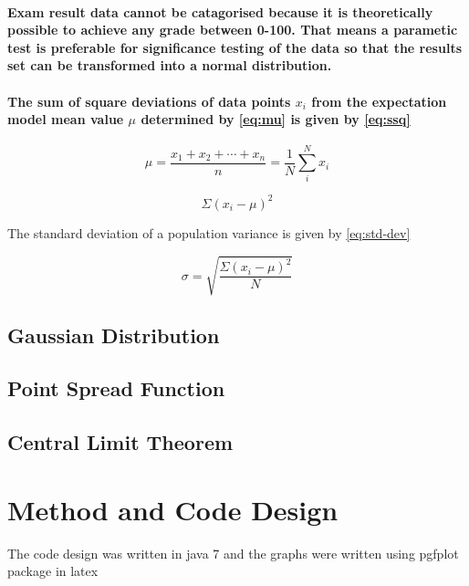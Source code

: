 \documentclass[12pt]{article}
\begin{document}
\paragraph{Exam result data cannot be catagorised because it is theoretically possible to achieve
any grade between 0-100. That means a parametic test is preferable for significance
 testing of the data so that the results set can be transformed into a normal distribution.}

\paragraph{The sum of square deviations of data points $x_i$ from the expectation model mean value $\mu$
 determined by \cref{eq:mu} is given by \cref{eq:ssq}}

\begin{equation}
\mu = \frac{x_1 + x_2 + \cdots + x_n}{n} = \frac{1}{N}\sum_{i}^{N} x_i
\label{eq:mu}
\end{equation}

\begin{equation}
\Sigma{(x_i-\mu)^2}
\label{eq:ssq}
\end{equation}

The standard deviation of a population variance is given by \cref{eq:std-dev} 

\begin{equation}
\sigma=\sqrt{\frac{\Sigma{(x_i-\mu)^2}}{N}}
\label{eq:std-dev}
\end{equation}

\subsection{Gaussian Distribution}

\subsection{Point Spread Function}

\subsection{Central Limit Theorem}

\section{Method and Code Design}

The code design was written in java 7 and the graphs were written using pgfplot
package in latex 
\end{document}
